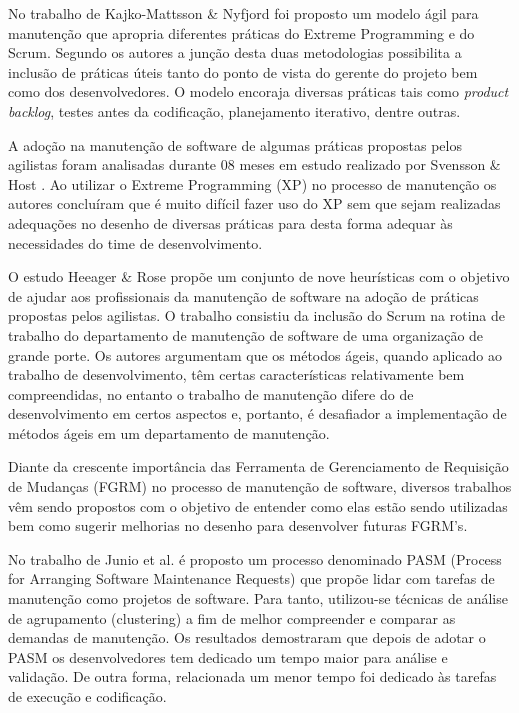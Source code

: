 \documentclass[msc,proposal,hidelot,hideabstract]{ppgccufmg} %
\begin{document}
No trabalho de Kajko-Mattsson \& Nyfjord \cite{4755767} foi proposto um modelo ágil para manutenção que apropria diferentes práticas do Extreme Programming e do Scrum. Segundo os autores a junção desta duas metodologias possibilita a inclusão de práticas úteis tanto do ponto de vista do gerente do projeto bem como dos desenvolvedores. O modelo encoraja diversas práticas tais como \textit{product backlog}, testes antes da codificação, planejamento iterativo, dentre outras.

A adoção na manutenção de software de algumas práticas propostas pelos agilistas foram analisadas durante 08 meses em estudo realizado por Svensson \& Host \cite{1402140}. Ao utilizar o Extreme Programming (XP) no processo de manutenção os autores concluíram que é muito difícil fazer uso do XP sem que sejam realizadas adequações no desenho de diversas práticas para desta forma adequar às necessidades do time de desenvolvimento.

O estudo Heeager \& Rose \cite{Heeager2015} propõe um conjunto de nove heurísticas com o objetivo de ajudar aos profissionais da manutenção de software na adoção de práticas propostas pelos agilistas. O trabalho consistiu da inclusão do Scrum na rotina de trabalho do departamento de manutenção de software de uma organização de grande porte. Os autores argumentam que os métodos ágeis, quando aplicado ao trabalho de desenvolvimento, têm certas características relativamente bem compreendidas, no entanto o trabalho de manutenção difere do de desenvolvimento em certos aspectos e, portanto, é desafiador a implementação de métodos ágeis em um departamento de manutenção.

Diante da crescente importância das Ferramenta de Gerenciamento de Requisição de Mudanças (FGRM) no processo de manutenção de software, diversos trabalhos vêm sendo propostos com o objetivo de entender como elas estão sendo utilizadas bem como sugerir melhorias no desenho para desenvolver futuras FGRM's.

No trabalho de Junio et al. \cite{5741246} é proposto um processo denominado PASM (Process for Arranging
Software Maintenance Requests) que propõe lidar com tarefas de manutenção como projetos de software. Para tanto, utilizou-se técnicas de análise de agrupamento (clustering) a fim de melhor compreender e comparar as demandas de manutenção. Os resultados demostraram que depois de adotar o PASM os
desenvolvedores tem dedicado um tempo maior para análise e validação. De outra forma, relacionada um menor tempo foi dedicado às tarefas de execução e codificação.
\end{document}

